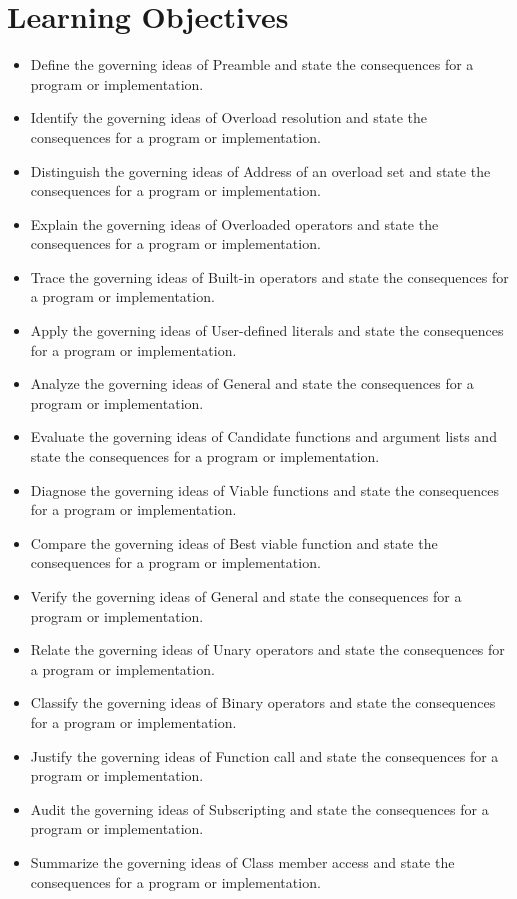 \documentclass[11pt,letterpaper]{article}
\begin{document}
\section{Learning Objectives}
\begin{itemize}[label=\textcolor{CornellReferenceTeal}{$\blacktriangleright$}]
\item Define the governing ideas of Preamble and state the consequences for a program or implementation.
\item Identify the governing ideas of Overload resolution and state the consequences for a program or implementation.
\item Distinguish the governing ideas of Address of an overload set and state the consequences for a program or implementation.
\item Explain the governing ideas of Overloaded operators and state the consequences for a program or implementation.
\item Trace the governing ideas of Built-in operators and state the consequences for a program or implementation.
\item Apply the governing ideas of User-defined literals and state the consequences for a program or implementation.
\item Analyze the governing ideas of General and state the consequences for a program or implementation.
\item Evaluate the governing ideas of Candidate functions and argument lists and state the consequences for a program or implementation.
\item Diagnose the governing ideas of Viable functions and state the consequences for a program or implementation.
\item Compare the governing ideas of Best viable function and state the consequences for a program or implementation.
\item Verify the governing ideas of General and state the consequences for a program or implementation.
\item Relate the governing ideas of Unary operators and state the consequences for a program or implementation.
\item Classify the governing ideas of Binary operators and state the consequences for a program or implementation.
\item Justify the governing ideas of Function call and state the consequences for a program or implementation.
\item Audit the governing ideas of Subscripting and state the consequences for a program or implementation.
\item Summarize the governing ideas of Class member access and state the consequences for a program or implementation.
\end{itemize}
\end{document}
